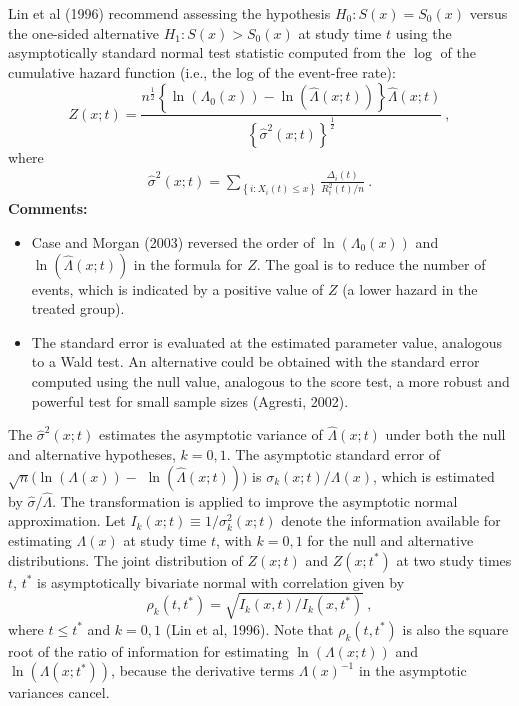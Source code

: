 \documentclass[12pt]{article}
\begin{document}
Lin et al (1996) recommend assessing the hypothesis $H_0: S(x)=S_0(x)$ versus the one-sided alternative $H_1: S(x)>S_0(x)$ at study time $t$ using the asymptotically standard normal test statistic
computed from the $\log$ of the cumulative hazard function (i.e., the log of the event-free rate):
\begin{equation}
Z(x;t)=\frac{n^{\frac{1}{2}}\left\{\ln\left(\Lambda_0(x)\right)-\ln\left(\hat\Lambda(x;t)\right)\right\}\hat\Lambda(x;t)}{\left\{\hat\sigma^2(x;t)\right\}^{\frac{1}{2}}} \ ,
\label{Zeq}
\end{equation}
where
\begin{eqnarray}
\hat\sigma^2(x;t)=\sum_{\left\{i: X_i(t)\leq x\right\}}  \frac{\Delta_i(t)}{R_i^2(t)/n}
\ .
\end{eqnarray}
{\bf Comments:}
\begin{itemize}
\item
Case and Morgan (2003) reversed the order of $\ln\left(\Lambda_0(x)\right)$ and
$\ln\left(\hat\Lambda(x;t)\right)$ in the formula for $Z$. The goal is to reduce the number of
events, which is indicated by a positive value of $Z$ (a lower hazard in the treated group).
\item
The standard error is evaluated at the estimated parameter value, analogous to a Wald test. An alternative could be obtained with the standard error computed using the null value, analogous to the
score test, a more robust and powerful test for small sample sizes (Agresti, 2002).
\end{itemize}

The $\hat\sigma^2(x;t)$ estimates the asymptotic variance of $\hat\Lambda(x;t)$ under both the null and
alternative hypotheses, $k=0,1$. The asymptotic standard error of $\sqrt{n}
\big(\ln(\Lambda(x))-$ $\ln(\hat\Lambda(x;t))\big)$ is $\sigma_k(x;t)/\Lambda(x)$, which is estimated by
$\hat\sigma/\hat\Lambda$.  The transformation is applied to improve the asymptotic normal
approximation. Let $I_k(x;t)\equiv 1/\sigma_k^2(x;t)$ denote the information available for
estimating $\Lambda(x)$ at study time $t$, with $k=0,1$ for the null and alternative
distributions. The joint distribution of $Z(x;t)$ and $Z(x;t^*)$ at two study times $t$, $t^*$ is asymptotically
bivariate normal with correlation given by
\begin{equation}
\rho_k(t,t^*)=\sqrt{I_k(x,t)/I_k(x,t^*)} \ , \label{eqnrho}
\end{equation}
where $t\leq t^*$ and $k=0,1$ (Lin et al, 1996).  Note that $\rho_k(t,t^*)$ is also the square root of the ratio of information for estimating $\ln\left(\Lambda(x;t)\right)$ and
$\ln\left(\Lambda(x;t^*)\right)$, because the derivative terms ${\Lambda(x)}^{-1}$ in the asymptotic variances cancel.
\end{document}
